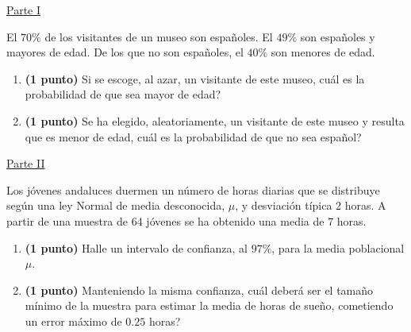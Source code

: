 
\noindent\underline{Parte I}

El $70\%$ de los visitantes de un museo son españoles. El $49\%$ son españoles y mayores de edad. De los que no son españoles, el $40\%$ son menores de edad.
\begin{enumerate}[label=\alph*)]
\item \textbf{(1 punto)} Si se escoge, al azar, un visitante de este museo, \textquestiondown{}cuál es la probabilidad de que sea mayor de edad?
\item \textbf{(1 punto)} Se ha elegido, aleatoriamente, un visitante de este museo y resulta que es menor de edad, \textquestiondown{}cuál es la probabilidad de que no sea español?
\end{enumerate}
\par\noindent\begin{minipage}{\linewidth}
\noindent\underline{Parte II}

Los jóvenes andaluces duermen un número de horas diarias que se distribuye según una ley Normal de media desconocida, $\mu$, y desviación típica 2 horas. A partir de una muestra de 64 jóvenes se ha obtenido una media de 7 horas.
\begin{enumerate}[label=\alph*)]
\item \textbf{(1 punto)} Halle un intervalo de confianza, al $97\%$, para la media poblacional $\mu$.
\item \textbf{(1 punto)} Manteniendo la misma confianza, \textquestiondown{}cuál deberá ser el tamaño mínimo de la muestra para estimar la media de horas de sueño, cometiendo un error máximo de $0.25$ horas?
\end{enumerate}
\end{minipage}\par
